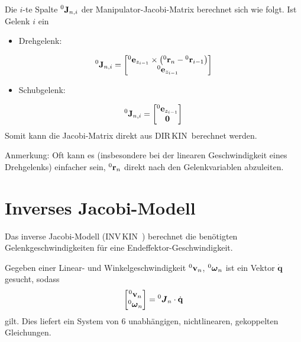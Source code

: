 \documentclass[a4paper, 11pt, accentcolor = tud3b]{tudreport}
\newcommand{\inreferenceto}[2]{\prescript{#1}{}{#2}}
\newcommand{\mat}[1]{\boldsymbol{#1}}
\renewcommand{\vec}[1]{\boldsymbol{\mathbf{#1}}}
\newcommand{\DIRKIN}{DIR\,KIN~}
\newcommand{\INVKIN}{INV\,KIN~}
\begin{document}
				Die \(i\)-te Spalte \( \inreferenceto{0}{\vec{J}}_{n, i} \) der Manipulator-Jacobi-Matrix berechnet sich wie folgt. Ist Gelenk \(i\) ein
				\begin{itemize}
					\item Drehgelenk:
				\end{itemize}
				\begin{equation*}
					\inreferenceto{0}{\vec{J}}_{n, i} =
						\begin{bmatrix}
							\inreferenceto{0}{\vec{e}}_{z_{i - 1}} \times \big(\! \inreferenceto{0}{\vec{r}}_n - \inreferenceto{0}{\vec{r}}_{i - 1} \big) \\
							\inreferenceto{0}{\vec{e}}_{z_{i - 1}}
						\end{bmatrix}
				\end{equation*}
				\begin{itemize}
					\item Schubgelenk:
				\end{itemize}
				\begin{equation*}
					\inreferenceto{0}{\vec{J}}_{n, i} =
						\begin{bmatrix}
							\inreferenceto{0}{\vec{e}}_{z_{i - 1}} \\
							\vec{0}
						\end{bmatrix}
				\end{equation*}
				Somit kann die Jacobi-Matrix direkt aus \DIRKIN berechnet werden.
				
				Anmerkung: Oft kann es (insbesondere bei der linearen Geschwindigkeit eines Drehgelenks) einfacher sein, \( \inreferenceto{0}{\vec{r}}_n \) direkt nach den Gelenkvariablen abzuleiten.

		\section{Inverses Jacobi-Modell}
			Das inverse Jacobi-Modell (\INVKIN) berechnet die benötigten Gelenkgeschwindigkeiten für eine Endeffektor-Geschwindigkeit.

			Gegeben einer Linear- und Winkelgeschwindigkeit \( \inreferenceto{0}{\vec{v}}_n \), \( \inreferenceto{0}{\vec{\omega}}_n \) ist ein Vektor \( \dot{\vec{q}} \) gesucht, sodass
			\begin{equation*}
				\begin{bmatrix}
					\inreferenceto{0}{\vec{v}}_n \\
					\inreferenceto{0}{\vec{\omega}}_n
				\end{bmatrix}
				=
				\inreferenceto{0}{\mat{J}}_n \cdot \dot{\vec{q}}
			\end{equation*}
			gilt. Dies liefert ein System von \(6\) unabhängigen, nichtlinearen, gekoppelten Gleichungen.
\end{document}
